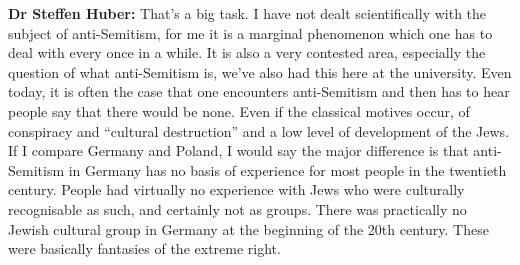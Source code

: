 \textbf{Dr Steffen Huber:} That's a big task. I have not dealt scientifically with the subject of anti-Semitism, for me it is a marginal phenomenon which one has to deal with every once in a while. It is also a very contested area, especially the question of what anti-Semitism is, we’ve also had this here at the university. Even today, it is often the case that one encounters anti-Semitism and then has to hear people say that there would be none. Even if the classical motives occur, of conspiracy and ``cultural destruction'' and a low level of development of the Jews. \\
If I compare Germany and Poland, I would say the major difference is that anti-Semitism in Germany has no basis of experience for most people in the twentieth century. People had virtually no experience with Jews who were culturally recognisable as such, and certainly not as groups. There was practically no Jewish cultural group in Germany at the beginning of the 20th century. These were basically fantasies of the extreme right.\\
